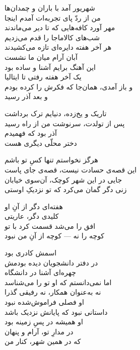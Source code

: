 \begin{lyrics}[12em]

\begin{Arabic}
شهریور آمد با باران و چمدان‌ها\\
من از ردّ پای تجربه‌ات آمدم اینجا\\
مهر آورد کافه‌هایی که تا دیر می‌ماندند\\
شب‌های کالاماجا را قدم می‌زدیم\\
هر آخر هفته دایره‌ای تازه می‌کشیدند\\
آبان آرام میان ما نشست\\
این آهنگ برایم آشنا و ساده بود\\
یک آخر هفته رفتی تا ایتالیا\\
و باز آمدی، همان‌جا که فکرش را کرده بودم\\
و بعد آذر رسید
\end{Arabic}

\begin{Arabic}
تاریک و یخ‌زده، دنیایم ترک برداشت\\
پس از تولدت، سرنوشت من از راه رسید\\
آذر بود که فهمیدم\\
دختر محلّی دیگری هست
\end{Arabic}

\begin{Arabic}
هرگز نخواستم تنها کسِ تو باشم\\
این قصه‌ی حسادت نیست، قصه‌ی جای پاست\\
جایی در این شهر کوچک، آن‌سوی خیابان\\
زنی دگر گمان می‌کرد که تو نزدیکِ اوستی

هفته‌ای دگر از آنِ او\\
کلیدی دگر، عاریتی\\
افق را می‌شد قسمت کرد با تو\\
کوچه را نه — کوچه از آنِ من نبود
\end{Arabic}

\begin{Arabic}
اسمش کادری بود\\
در دفتر دانشجویان دیده بودمش\\
چهره‌ای آشنا در دانشگاه\\
اما نمی‌دانستم که او تو را می‌شناسد\\
نه به‌عنوان همکار، نه رفیقی گذرا\\
او فصلی فراموش‌شده نبود\\
داستانی نبود که پایانش نزدیک باشد\\
او همیشه در پسِ زمینه بود\\
در مدارِ تو، آرام و پنهان\\
که در همین شهر، کنار من
\end{Arabic}


\end{lyrics}

